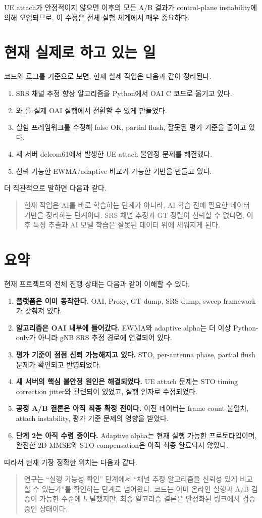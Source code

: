 \documentclass[11pt,a4paper]{article}
\newcommand{\code}[1]{\texttt{\detokenize{#1}}}
\begin{document}
UE attach가 안정적이지 않으면 이후의 모든 A/B 결과가 control-plane instability에 의해 오염되므로, 이 수정은 전체 실험 체계에서 매우 중요하다.

\section{현재 실제로 하고 있는 일}

코드와 로그를 기준으로 보면, 현재 실제 작업은 다음과 같이 정리된다.

\begin{enumerate}
  \item SRS 채널 추정 향상 알고리즘을 Python에서 OAI C 코드로 옮기고 있다.
  \item \code{ewma}와 \code{adaptive}를 실제 OAI 실행에서 전환할 수 있게 만들었다.
  \item 실험 프레임워크를 수정해 false OK, partial flush, 잘못된 평가 기준을 줄이고 있다.
  \item 새 서버 dclcom61에서 발생한 UE attach 불안정 문제를 해결했다.
  \item 신뢰 가능한 EWMA/adaptive 비교가 가능한 기반을 만들고 있다.
\end{enumerate}

더 직관적으로 말하면 다음과 같다.

\begin{quote}
현재 작업은 AI를 바로 학습하는 단계가 아니라, AI 학습 전에 필요한 데이터 기반을 정리하는 단계이다. SRS 채널 추정과 GT 정렬이 신뢰할 수 없다면, 이후 특징 추출과 AI 모델 학습은 잘못된 데이터 위에 세워지게 된다.
\end{quote}

\section{요약}

현재 프로젝트의 전체 진행 상태는 다음과 같이 이해할 수 있다.

\begin{enumerate}
  \item \textbf{플랫폼은 이미 동작한다.} OAI, Proxy, GT dump, SRS dump, sweep framework가 갖춰져 있다.
  \item \textbf{알고리즘은 OAI 내부에 들어갔다.} EWMA와 adaptive alpha는 더 이상 Python-only가 아니라 gNB SRS 추정 경로에 연결되어 있다.
  \item \textbf{평가 기준이 점점 신뢰 가능해지고 있다.} STO, per-antenna phase, partial flush 문제가 확인되고 반영되었다.
  \item \textbf{새 서버의 핵심 불안정 원인은 해결되었다.} UE attach 문제는 STO timing correction jitter와 관련되어 있었고, 실행 인자로 수정되었다.
  \item \textbf{공정 A/B 결론은 아직 최종 확정 전이다.} 이전 데이터는 frame count 불일치, attach instability, 평가 기준 문제의 영향을 받았다.
  \item \textbf{단계 2는 아직 수렴 중이다.} Adaptive alpha는 현재 실행 가능한 프로토타입이며, 완전한 2D MMSE와 STO compensation은 아직 최종 완료되지 않았다.
\end{enumerate}

따라서 현재 가장 정확한 위치는 다음과 같다.

\begin{quote}
연구는 ``실행 가능성 확인'' 단계에서 ``채널 추정 알고리즘을 신뢰성 있게 비교할 수 있는가''를 확인하는 단계로 넘어왔다. 코드는 이미 온라인 실행과 A/B 검증이 가능한 수준에 도달했지만, 최종 알고리즘 결론은 안정화된 링크에서 검증 중인 상태이다.
\end{quote}
\end{document}
